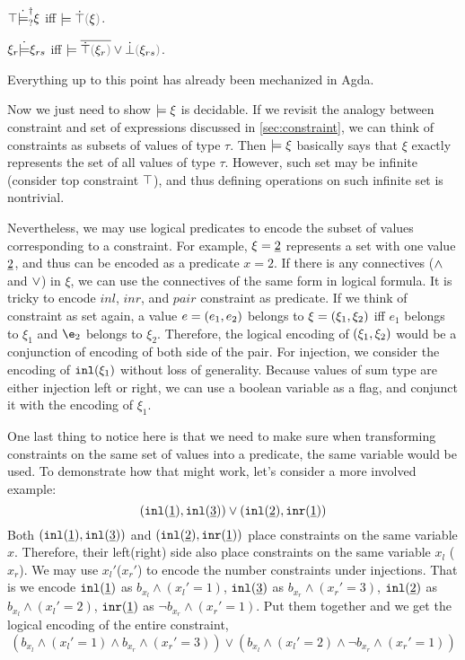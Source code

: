 \begin{theorem}
\label{theorem:exhaustive-truify}
  $\top \dot{\models}_{?}^{\dag} \xi$ iff $\ccsatisfy{}{\ctruify{\xi}}$.
\end{theorem}

\begin{theorem}
\label{theorem:redundant-truify-falsify}
  $\xi_r \dot{\models} \xi_{rs}$ iff $\ccsatisfy{}{\cor{\cdual{\ctruify{\xi_r}}}{\cfalsify{\xi_{rs}}}}$.
\end{theorem}

Everything up to this point has already been mechanized in Agda. 

Now we just need to show $\models \xi$ is decidable.
If we revisit the analogy between constraint and set of expressions discussed in \autoref{sec:constraint}, we can think of constraints as subsets of values of type $\tau$.
Then $\models \xi$ basically says that $\xi$ exactly represents the set of all values of type $\tau$. 
However, such set may be infinite (consider top constraint $\top$),
and thus defining operations on such infinite set is nontrivial. 

Nevertheless, we may use logical predicates to encode the subset of values corresponding to a constraint. 
For example, $\xi=\underline{2}$ represents a set with one value $\underline{2}$, and thus can be encoded as a predicate $x=2$. 
If there is any connectives ($\wedge$ and $\vee$) in $\xi$, we can use the connectives of the same form in logical formula. 
It is tricky to encode $inl$, $inr$, and $pair$ constraint as predicate. 
If we think of constraint as set again, a value $e=(e_1 , e_2)$ belongs to $\xi=(\xi_1 , \xi_2)$ iff $e_1$ belongs to $\xi_1$ and $\e_2$ belongs to $\xi_2$. 
Therefore, the logical encoding of $(\xi_1 , \xi_2)$ would be a conjunction of encoding of both side of the pair.
For injection, we consider the encoding of $\mathtt{inl}(\xi_1)$ without loss of generality. Because values of sum type are either injection left or right, we can use a boolean variable as a flag, and conjunct it with the encoding of $\xi_1$.

One last thing to notice here is that we need to make sure when transforming constraints on the same set of values into a predicate, the same variable would be used. To demonstrate how that might work, let's consider a more involved example:
\[ (\mathtt{inl}(\underline{1}) , \mathtt{inl}(\underline{3})) \vee (\mathtt{inl}(\underline{2}) , \mathtt{inr}(\underline{1})) \]
Both $(\mathtt{inl}(\underline{1}) , \mathtt{inl}(\underline{3}))$ and $(\mathtt{inl}(\underline{2}) , \mathtt{inr}(\underline{1}))$ place constraints on the same variable $x$.
Therefore, their left(right) side also place constraints on the same variable $x_l$ ($x_r$). 
We may use $x_l'$($x_r'$) to encode the number constraints under injections. 
That is we encode $\mathtt{inl}(\underline{1})$ as $b_{x_l} \wedge (x_l'=1)$, 
$\mathtt{inl}(\underline{3})$ as $b_{x_r} \wedge (x_r'=3)$,
$\mathtt{inl}(\underline{2})$ as $b_{x_l} \wedge (x_l'=2)$,
$\mathtt{inr}(\underline{1})$ as $\neg b_{x_r} \wedge (x_r'=1)$. 
Put them together and we get the logical encoding of the entire constraint, 
\[
(b_{x_l} \wedge (x_l'=1) \wedge
b_{x_r} \wedge (x_r'=3))
\vee
(b_{x_l} \wedge (x_l'=2) \wedge
\neg b_{x_r} \wedge (x_r'=1))
\]

